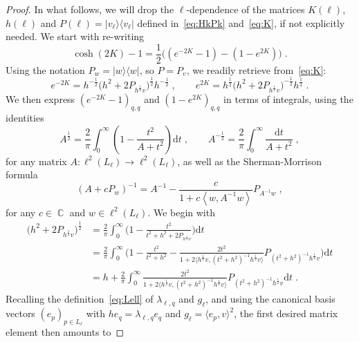 \documentclass[12pt,a4paper]{article}
\numberwithin{equation}{section}
\newcommand{\1}{\mathbb{I}}
\DeclareMathOperator{\C}{\mathbb{C}}
\newcommand{\half}{\frac{1}{2}}
\newcommand{\eva}[1]{\left\langle #1 \right\rangle}
\theoremstyle{plain}
\theoremstyle{definition}
\theoremstyle{remark}
\theoremstyle{plain}
\theoremstyle{definition}
\theoremstyle{remark}
\begin{document}
\begin{proof}
In what follows, we will drop the $ \ell $-dependence of the matrices $ K(\ell) $, $ h(\ell) $ and $ P(\ell) = |v_\ell \rangle \langle v_\ell| $ defined in~\eqref{eq:HkPk} and~\eqref{eq:K}, if not explicitly needed. We start with re-writing
\begin{equation} \label{eq:coshrewriting}
	\cosh(2K)-1
	= \half\big((e^{-2K}-1)-(1-e^{2K})\big) \;.
\end{equation}
Using the notation $ P_w = |w \rangle \langle w| $, so $ P = P_v $, we readily retrieve from~\eqref{eq:K}:
\begin{equation} \label{eq:e-2k}
	e^{-2K} = h^{-\half} \big(h^2 +2P_{h^{\half} v}\big)^{\half} h^{-\half} \;, \qquad
	e^{2K} = h^{\half} \big(h^2 +2P_{h^{\half} v}\big)^{-\half} h^{\half} \;.
\end{equation}
We then express $ (e^{-2K}-1)_{q,q} $ and $ (1-e^{2K})_{q,q} $ in terms of integrals, using the identities
\begin{equation} \label{eq:intid}
	A^\half = \frac{2}{\pi} \int_0^\infty \left(1- \frac{t^2}{A+t^2}\right) \mathrm{d}t \;,\qquad
	A^{-\half} = \frac{2}{\pi} \int_0^\infty \frac{\mathrm{d}t}{A+t^2} \;,
\end{equation}
for any matrix $ A: \ell^2(L_\ell) \to \ell^2(L_\ell) $, as well as the Sherman-Morrison formula
\begin{equation} \label{eq:shermor}
	(A+cP_w)^{-1} = A^{-1} - \frac{c}{1+c\eva{w, A^{-1}w}}P_{A^{-1}w} \;,
\end{equation}
for any $ c \in \C $ and $ w \in \ell^2(L_\ell) $. We begin with 
\begin{align}
	\big(h^2 +2P_{h^{\half} v}\big)^{\half} &= \frac{2}{\pi} \int_0^\infty \Bigg( 1- \frac{t^2}{t^2+h^2 +2P_{h^{\half} v}}\Bigg)\mathrm{d}t\nonumber\\
	&= \frac{2}{\pi} \int_0^\infty \Bigg( 1- \frac{t^2}{t^2+h^2} - \frac{2 t^2}{1+ 2 \big\langle h^{\half} v ,(t^2+h^2)^{-1} h^\half v \big\rangle } P_{(t^2+h^2)^{-1}h^{\half} v} \Bigg) \mathrm{d}t \nonumber\\
	&= h + \frac{2}{\pi} \int_0^\infty \frac{2t^2}{1+ 2 \big\langle h^{\half} v ,(t^2+h^2)^{-1} h^\half v \big\rangle }  P_{(t^2+h^2)^{-1}h^{\half} v}\mathrm{d}t \;.
\end{align}
Recalling the definition~\eqref{eq:Lell} of $ \lambda_{\ell,q} $ and $ g_\ell $, and using the canonical basis vectors $ (e_p)_{p \in L_\ell} $ with $ h e_q = \lambda_{\ell,q} e_q $ and $ g_\ell = \langle e_p,v \rangle^2 $, the first desired matrix element then amounts to

\end{proof}
\end{document}
